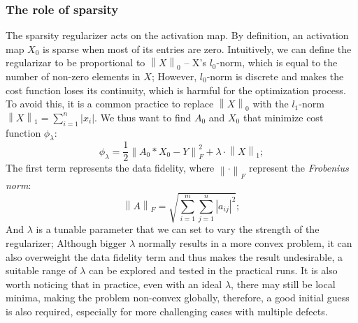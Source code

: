 \subsubsection{The role of sparsity}
The sparsity regularizer acts on the activation map. By definition, an activation map $X_0$ is sparse when most of its entries are zero. Intuitively, we can define the regularizar to be proportional to $\left\lVert X\right\rVert_0$ -- X's $l_0$-norm, which is equal to the number of non-zero elements in $X$; However, $l_0$-norm is discrete and makes the cost function loses its continuity, which is harmful for the optimization process. To avoid this, it is a common practice to replace $\left\lVert X\right\rVert_0$ with the $l_1$-norm $\left\lVert X\right\rVert_1 = \sum_{i=1}^{n}\vert x_i \vert$. We thus want to find $A_0$ and $X_0$ that minimize cost function $\phi_{\lambda}$:
\begin{equation}
	\phi_{\lambda} = \frac{1}{2}\left\lVert A_0 * X_0 - Y \right\rVert^2_F + \lambda \cdot \left\lVert X\right\rVert_1;
\end{equation}
\noindent The first term represents the data fidelity, where $\left\lVert \cdot\right\rVert_F$ represent the \textit{Frobenius norm}: 
\[
\left\lVert A \right\rVert_F = \sqrt{ \sum_{i=1}^{m} \sum_{j=1}^{n} |a_{ij}|^2 };
\] 
\noindent And $\lambda$ is a tunable parameter that we can set to vary the strength of the regularizer; Although bigger $\lambda$ normally results in a more convex problem, it can also overweight the data fidelity term and thus makes the result undesirable, a suitable range of $\lambda$ can be explored and tested in the practical runs. It is also worth noticing that in practice, even with an ideal $\lambda$, there may still be local minima, making the problem non-convex globally, therefore, a good initial guess is also required, especially for more challenging cases with multiple defects. 


